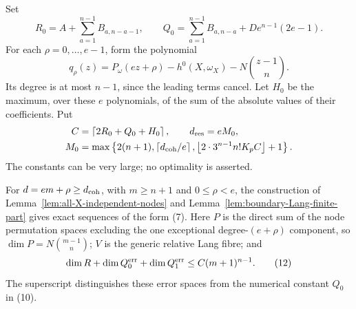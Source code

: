 Set
\[
 R_0=A+\sum_{a=1}^{n-1}B_{a,n-a-1},
 \qquad
 Q_0=\sum_{a=1}^{n-1}B_{a,n-a}
           +D e^{n-1}(2e-1).
 \tag{10}
\]
For each $\rho=0,\ldots,e-1$, form the polynomial
\[
 q_\rho(z)=P_\omega(ez+\rho)-h^0(X,\omega_X)
                           -N\binom{z-1}{n}.
 \tag{11}
\]
Its degree is at most $n-1$, since the leading terms cancel.
Let $H_0$ be the maximum, over these $e$ polynomials, of
the sum of the absolute values of their coefficients.
Put
\begin{equation}\label{eq:all-X-C-bound}
\begin{aligned}
 C&=\left\lceil2R_0+Q_0+H_0\right\rceil,
       \qquad d_{\rm res}=eM_0,\\
 M_0&=\max\left\{2(n+1),\left\lceil d_{\rm coh}/e\right\rceil,
       \left\lfloor2\cdot3^{n-1}n!K_pC\right\rfloor+1\right\}.
\end{aligned}
\end{equation}
The constants can be very large; no optimality is asserted.

\begin{lemma}\label{lem:all-X-boundary-errors}
For $d=em+\rho\geq d_{\rm coh}$, with $m\geq n+1$ and
$0\leq\rho<e$, the construction of
Lemma~\ref{lem:all-X-independent-nodes} and
Lemma~\ref{lem:boundary-Lang-finite-part} gives exact
sequences of the form (7).  Here $P$ is the direct sum of
the node permutation spaces excluding the one exceptional
degree-$(e+\rho)$ component, so
$\dim P=N\binom{m-1}{n}$; $V$ is the generic relative
Lang fibre; and
\[
 \dim R+\dim Q_0^{\rm err}+\dim Q_1^{\rm err}
       \leq C(m+1)^{n-1}.
 \tag{12}
\]
The superscript distinguishes these error spaces from the
numerical constant $Q_0$ in (10).
\end{lemma}

